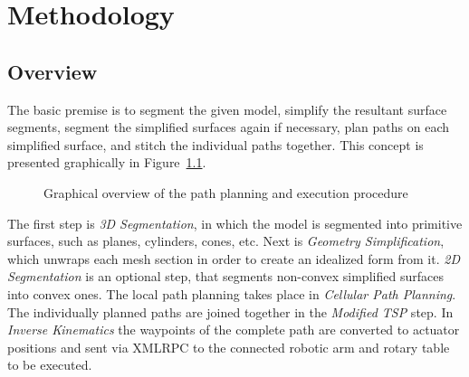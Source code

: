 \chapter{Methodology}\label{sec:mtdy}

\section{Overview}
The basic premise is to segment the given model, simplify the resultant surface segments, segment the simplified surfaces again if necessary, plan paths on each simplified surface, and stitch the individual paths together.
This concept is presented graphically in Figure~\ref{fig:mtdy_overview}.
\begin{figure}[ht]
	\centering
{}
	\caption{Graphical overview of the path planning and execution procedure}
	\label{fig:mtdy_overview}
\end{figure}

The first step is \textit{3D Segmentation}, in which the model is segmented into primitive surfaces, such as planes, cylinders, cones, etc.
Next is \textit{Geometry Simplification}, which unwraps each mesh section in order to create an idealized form from it.
\textit{2D Segmentation} is an optional step, that segments non-convex simplified surfaces into convex ones.
The local path planning takes place in \textit{Cellular Path Planning}.
The individually planned paths are joined together in the \textit{Modified TSP} step.
In \textit{Inverse Kinematics} the waypoints of the complete path are converted to actuator positions and sent via XMLRPC to the connected robotic arm and rotary table to be executed.

